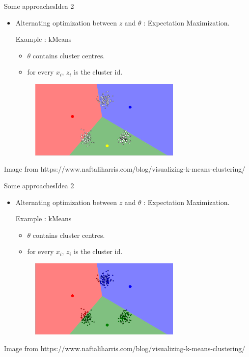 \documentclass{beamer}
\begin{document}
\begin{frame}{Some approaches}{Idea 2}
    \begin{itemize}
        \item {
            Alternating optimization between $z$ and $\theta$ : Expectation Maximization.

            \vspace{3mm}
            Example : kMeans
            \begin{itemize}
                \item $\theta$ contains cluster centres.
                \item for every $x_i$, $z_i$ is the cluster id.
            \end{itemize}
        }
        \begin{figure}
            \centering
            \includegraphics[width=0.7\textwidth]{kmeans2}
        \end{figure}
    \end{itemize}
    {\small Image from https://www.naftaliharris.com/blog/visualizing-k-means-clustering/}
\end{frame}
\begin{frame}{Some approaches}{Idea 2}
    \begin{itemize}
        \item {
            Alternating optimization between $z$ and $\theta$ : Expectation Maximization.

            \vspace{3mm}
            Example : kMeans
            \begin{itemize}
                \item $\theta$ contains cluster centres.
                \item for every $x_i$, $z_i$ is the cluster id.
            \end{itemize}
        }
        \begin{figure}
            \centering
            \includegraphics[width=0.7\textwidth]{kmeans3}
        \end{figure}
    \end{itemize}
    {\small Image from https://www.naftaliharris.com/blog/visualizing-k-means-clustering/}
\end{frame}
\end{document}
